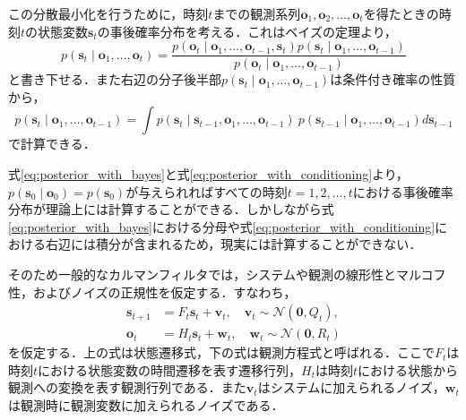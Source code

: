         この分散最小化を行うために，時刻$t$までの観測系列$\bm{o}_1, \bm{o}_2, \dots, \bm{o}_t$を得たときの時刻$t$の状態変数$\bm{s}_t$の事後確率分布を考える．これはベイズの定理より，
        \begin{equation}
            \label{eq:posterior_with_bayes}
            p(\bm{s}_t \mid \bm{o}_1,\dots, \bm{o}_t ) = \frac{p(\bm{o}_t \mid \bm{o}_1,\dots, \bm{o}_{t-1}, \bm{s}_t) p(\bm{s}_t \mid \bm{o}_1,\dots, \bm{o}_{t-1})}{p(\bm{o}_t \mid \bm{o}_1,\dots, \bm{o}_{t-1})}
        \end{equation}
        と書き下せる．また右辺の分子後半部$p(\bm{s}_t \mid \bm{o}_1,\dots, \bm{o}_{t-1})$は条件付き確率の性質から，
        \begin{equation}
            \label{eq:posterior_with_conditioning}
            p(\bm{s}_t \mid \bm{o}_1,\dots, \bm{o}_{t-1}) = \int p(\bm{s}_t \mid \bm{s}_{t-1}, \bm{o}_1, \dots, \bm{o}_{t-1}) ~ p(\bm{s}_{t-1} \mid \bm{o}_1, \dots, \bm{o}_{t-1}) d\bm{s}_{t-1}
        \end{equation}
        で計算できる．

        式\ref{eq:posterior_with_bayes}と式\ref{eq:posterior_with_conditioning}より，$p(\bm{s}_0 \mid \bm{o}_0) = p(\bm{s}_0)$が与えられればすべての時刻$t = 1, 2, \dots, t$における事後確率分布が理論上には計算することができる．しかしながら式\ref{eq:posterior_with_bayes}における分母や式\ref{eq:posterior_with_conditioning}における右辺には積分が含まれるため，現実には計算することができない．

        そのため一般的なカルマンフィルタでは，システムや観測の線形性とマルコフ性，およびノイズの正規性を仮定する．すなわち，
        \begin{equation}
            \label{eq:kalman_GL}
            \begin{aligned}
                \bm{s}_{t+1} &= F_t \bm{s}_t + \bm{v}_t, \quad \bm{v}_t \sim \mathcal{N}(\bm{0}, Q_t),
                \\ \bm{o}_t &= H_t \bm{s}_t + \bm{w}_t, \quad \bm{w}_t \sim \mathcal{N}(\bm{0}, R_t)
            \end{aligned}        
        \end{equation}
        を仮定する．上の式は状態遷移式，下の式は観測方程式と呼ばれる．ここで$F_t$は時刻$t$における状態変数の時間遷移を表す遷移行列，$H_t$は時刻$t$における状態から観測への変換を表す観測行列である．また$\bm{v}_t$はシステムに加えられるノイズ，$\bm{w}_t$は観測時に観測変数に加えられるノイズである．

